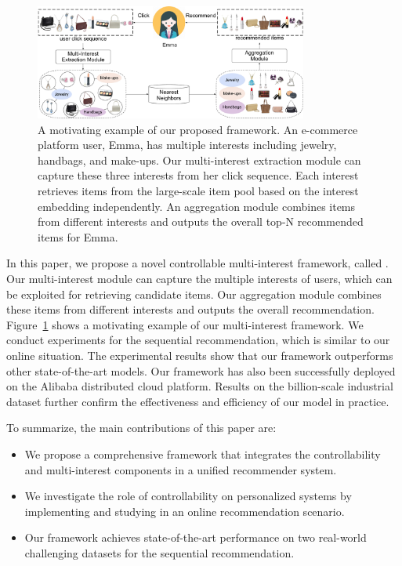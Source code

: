 \begin{figure}
    \centering
    \includegraphics[width=0.8\textwidth]{figures/multi-interest-overview.pdf}
    \caption{A motivating example of our proposed framework. An e-commerce platform user, Emma, has multiple interests including jewelry, handbags, and make-ups. Our multi-interest extraction module can capture these three interests from her click sequence. Each interest retrieves items from the large-scale item pool based on the interest embedding independently. An aggregation module combines items from different interests and outputs the overall top-N recommended items for Emma. }
    \label{fig:multiple_interest}
\end{figure}

In this paper, we propose a novel controllable multi-interest framework, called \model. Our multi-interest module can capture the multiple interests of users, which can be exploited for retrieving candidate items. Our aggregation module combines these items from different interests and outputs the overall recommendation. Figure~\ref{fig:multiple_interest} shows a motivating example of our multi-interest framework. We conduct experiments for the sequential recommendation, which is similar to our online situation. The experimental results show that our framework outperforms other state-of-the-art models. Our framework has also been successfully deployed on the Alibaba distributed cloud platform. Results on the billion-scale industrial dataset further confirm the effectiveness and efficiency of our model in practice. 

To summarize, the main contributions of this paper are:
\begin{itemize}
    \item We propose a comprehensive framework that integrates the controllability and multi-interest components in a unified recommender system. 
    \item We investigate the role of controllability on personalized systems by implementing and studying in an online recommendation scenario. 
    \item Our framework achieves state-of-the-art performance on two real-world challenging datasets for the sequential recommendation.
\end{itemize}

